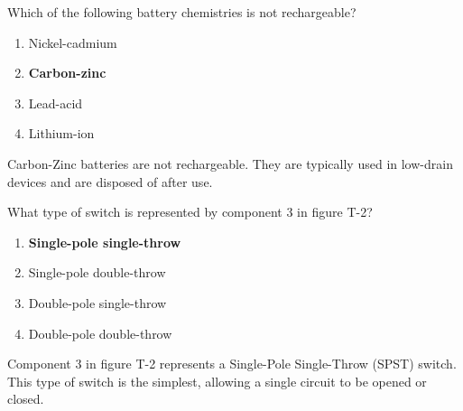 \begin{tcolorbox}[colback=gray!10!white,colframe=black!75!black,title={T6A11}]
    Which of the following battery chemistries is not rechargeable?
    \begin{enumerate}[label=\Alph*),noitemsep]
        \item Nickel-cadmium
        \item \textbf{Carbon-zinc}
        \item Lead-acid
        \item Lithium-ion
    \end{enumerate}
\end{tcolorbox}
Carbon-Zinc batteries are not rechargeable. They are typically used in low-drain devices and are disposed of after use.

\begin{tcolorbox}[colback=gray!10!white,colframe=black!75!black,title={T6A12}]
    What type of switch is represented by component 3 in figure T-2?
    \begin{enumerate}[label=\Alph*),noitemsep]
        \item \textbf{Single-pole single-throw}
        \item Single-pole double-throw
        \item Double-pole single-throw
        \item Double-pole double-throw
    \end{enumerate}
\end{tcolorbox}
Component 3 in figure T-2 represents a Single-Pole Single-Throw (SPST) switch. This type of switch is the simplest, allowing a single circuit to be opened or closed.
